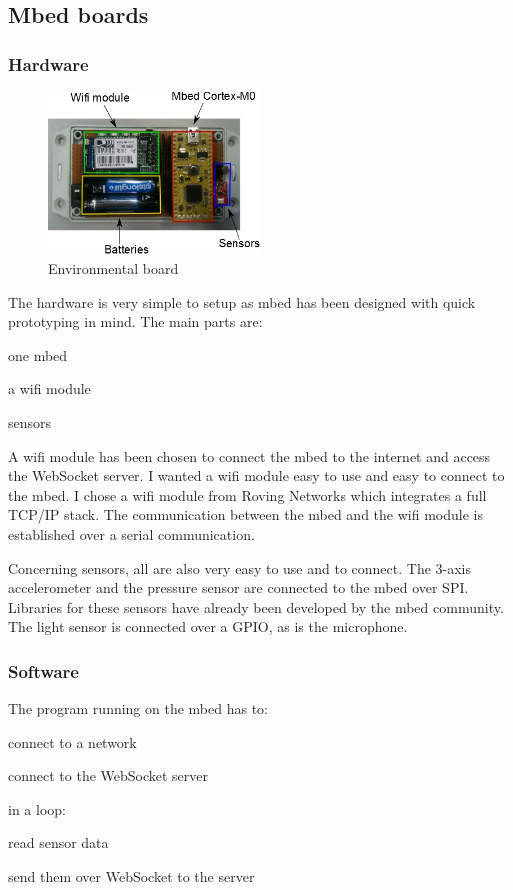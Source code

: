 \documentclass[pdftex,10pt,a4paper]{report}
\newenvironment{packed_item}{
\begin{itemize}
  \setlength{\itemsep}{1pt}
  \setlength{\parskip}{0pt}
  \setlength{\parsep}{0pt}
}{\end{itemize}}
\begin{document}
\subsection{Mbed boards}
\subsubsection{Hardware}

\begin{figure}[h!]
		\centering
		\includegraphics[width=0.5\textwidth]{./env_board.jpg}
		\caption{Environmental board}
		\label{Environmental board}
\end{figure}

The hardware is very simple to setup as mbed has been designed with quick prototyping in mind. The main parts are:
\begin{packed_item}
	\item one mbed
	\item a wifi module
	\item sensors
\end{packed_item}

A wifi module has been chosen to connect the mbed to the internet and access the WebSocket server. I wanted a wifi module easy to use and easy to connect to the mbed. I chose a wifi module from Roving Networks which integrates a full TCP/IP stack. The communication between the mbed and the wifi module is established over a serial communication.

Concerning sensors, all are also very easy to use and to connect. The 3-axis accelerometer and the pressure sensor are connected to the mbed over SPI. Libraries for these sensors have already been developed by the mbed community. The light sensor is connected over a GPIO, as is the microphone. 


\subsubsection{Software}
The program running on the mbed has to:
\begin{packed_item}
	\item connect to a network
	\item connect to the WebSocket server
	\item in a loop:
		\begin{packed_item}
			\item read sensor data
			\item send them over WebSocket to the server
		\end{packed_item}
\end{packed_item}
\end{document}

